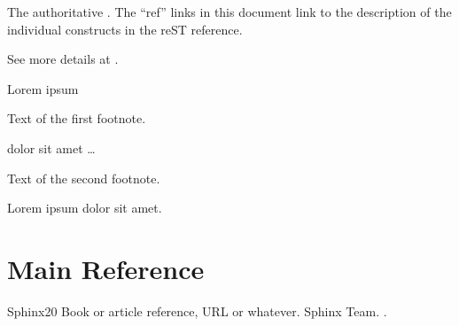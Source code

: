 \documentclass[letterpaper,12pt,english]{sphinxmanual}
\begin{document}
The authoritative .  The “ref” links in this
document link to the description of the individual constructs in the reST
reference.



See more details at .

Lorem ipsum %
\begin{footnote}[1]\sphinxAtStartFootnote
Text of the first footnote.
%
\end{footnote} dolor sit amet … %
\begin{footnote}[2]\sphinxAtStartFootnote
Text of the second footnote.
%
\end{footnote}

Lorem ipsum  dolor sit amet.


\chapter{Main Reference}
\label{\detokenize{reference:main-reference}}\label{\detokenize{reference:reference}}\label{\detokenize{reference::doc}}
\begin{sphinxthebibliography}{Sphinx20}
Book or article reference, URL or whatever.
Sphinx Team. .
\end{sphinxthebibliography}



\renewcommand{\indexname}{Index}
\printindex
\end{document}
